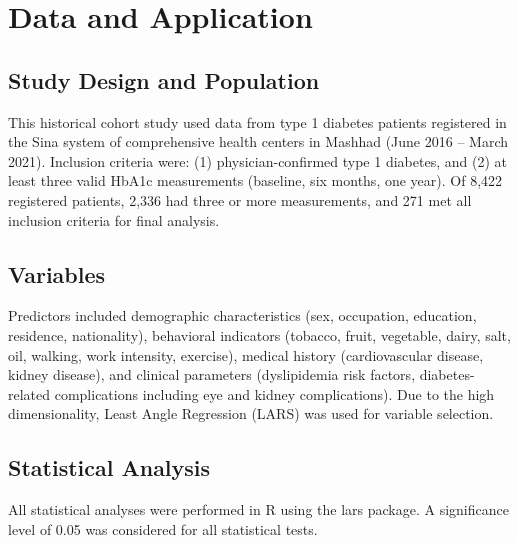 \documentclass[twoside]{article}
\begin{document}
\section{Data and Application}
\subsection{Study Design and Population}
This historical cohort study used data from type 1 diabetes patients registered in the Sina system of comprehensive health centers in Mashhad (June 2016 – March 2021). Inclusion criteria were: (1) physician-confirmed type 1 diabetes, and (2) at least three valid HbA1c measurements (baseline, six months, one year). Of 8,422 registered patients, 2,336 had three or more measurements, and 271 met all inclusion criteria for final analysis.
\subsection{Variables}
Predictors included demographic characteristics (sex, occupation, education, residence, nationality), behavioral indicators (tobacco, fruit, vegetable, dairy, salt, oil, walking, work intensity, exercise), medical history (cardiovascular disease, kidney disease), and clinical parameters (dyslipidemia risk factors, diabetes-related complications including eye and kidney complications). Due to the high dimensionality, Least Angle Regression (LARS) was used for variable selection.
\subsection{Statistical Analysis}
All statistical analyses were performed in R using the lars package. A significance level of 0.05 was considered for all statistical tests.
\end{document}
